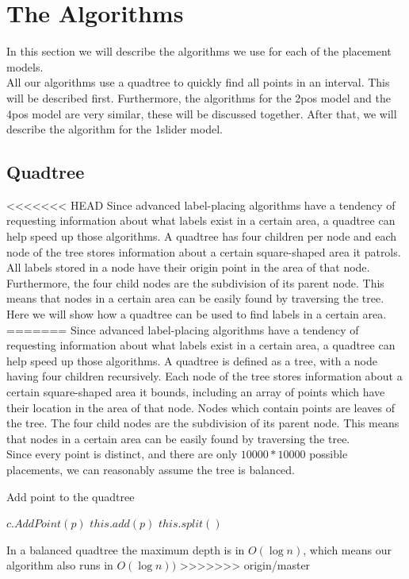 \documentclass[crop=false,a4paper,oneside,11pt]{article}
\begin{document}
\section{The Algorithms}
In this section we will describe the algorithms we use for each of the placement models.\\
All our algorithms use a quadtree to quickly find all points in an interval. This will be described first. Furthermore, the algorithms for the 2pos model and the 4pos model are very similar, these will be discussed together. After that, we will describe the algorithm for the 1slider model.

\subsection{Quadtree}
<<<<<<< HEAD
Since advanced label-placing algorithms have a tendency of requesting information about what labels exist in a certain area, a quadtree can help speed up those algorithms. A quadtree has four children per node and each node of the tree stores information about a certain square-shaped area it patrols. All labels stored in a node have their origin point in the area of that node. Furthermore, the four child nodes are the subdivision of its parent node. This means that nodes in a certain area can be easily found by traversing the tree.\\

Here we will show how a quadtree can be used to find labels in a certain area.
=======
Since advanced label-placing algorithms have a tendency of requesting information about what labels exist in a certain area, a quadtree can help speed up those algorithms. A quadtree is defined as a tree, with a node having four children recursively. Each node of the tree stores information about a certain square-shaped area it bounds, including an array of points which have their location in the area of that node. Nodes which contain points are leaves of the tree. The four child nodes are the subdivision of its parent node. This means that nodes in a certain area can be easily found by traversing the tree.\\
Since every point is distinct, and there are only $10000 * 10000$ possible placements, we can reasonably assume the tree is balanced.\\
\begin{algorithm}[H]
\caption{Add point to the quadtree}
\begin{algorithmic}[1]
\State $c.AddPoint(p)$
\EndIf
\EndFor
\Else{}
\State $this.add(p)$
\State $this.split()$ 
\EndIf
\EndIf
\EndProcedure
\end{algorithmic}
\end{algorithm}
In a balanced quadtree the maximum depth is in $O(\log{n})$, which means our algorithm also runs in $O(\log{n}))$
>>>>>>> origin/master
\end{document}
